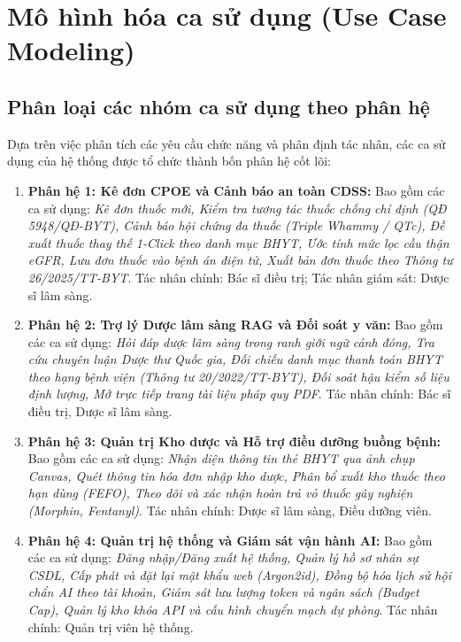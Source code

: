 \section{Mô hình hóa ca sử dụng (Use Case Modeling)}
\label{sec:use_case_modeling}

\subsection{Phân loại các nhóm ca sử dụng theo phân hệ}
\label{subsec:use_case_groups}

Dựa trên việc phân tích các yêu cầu chức năng và phân định tác nhân, các ca sử dụng của hệ thống được tổ chức thành bốn phân hệ cốt lõi:

\begin{enumerate}[leftmargin=1.8em]
    \item \textbf{Phân hệ 1: Kê đơn CPOE và Cảnh báo an toàn CDSS:}
    Bao gồm các ca sử dụng: \textit{Kê đơn thuốc mới, Kiểm tra tương tác thuốc chống chỉ định (QĐ 5948/QĐ-BYT), Cảnh báo hội chứng đa thuốc (Triple Whammy / QTc), Đề xuất thuốc thay thế 1-Click theo danh mục BHYT, Ước tính mức lọc cầu thận eGFR, Lưu đơn thuốc vào bệnh án điện tử, Xuất bản đơn thuốc theo Thông tư 26/2025/TT-BYT}. Tác nhân chính: Bác sĩ điều trị; Tác nhân giám sát: Dược sĩ lâm sàng.
    
    \item \textbf{Phân hệ 2: Trợ lý Dược lâm sàng RAG và Đối soát y văn:}
    Bao gồm các ca sử dụng: \textit{Hỏi đáp dược lâm sàng trong ranh giới ngữ cảnh đóng, Tra cứu chuyên luận Dược thư Quốc gia, Đối chiếu danh mục thanh toán BHYT theo hạng bệnh viện (Thông tư 20/2022/TT-BYT), Đối soát hậu kiểm số liệu định lượng, Mở trực tiếp trang tài liệu pháp quy PDF}. Tác nhân chính: Bác sĩ điều trị, Dược sĩ lâm sàng.
    
    \item \textbf{Phân hệ 3: Quản trị Kho dược và Hỗ trợ điều dưỡng buồng bệnh:}
    Bao gồm các ca sử dụng: \textit{Nhận diện thông tin thẻ BHYT qua ảnh chụp Canvas, Quét thông tin hóa đơn nhập kho dược, Phân bổ xuất kho thuốc theo hạn dùng (FEFO), Theo dõi và xác nhận hoàn trả vỏ thuốc gây nghiện (Morphin, Fentanyl)}. Tác nhân chính: Dược sĩ lâm sàng, Điều dưỡng viên.
    
    \item \textbf{Phân hệ 4: Quản trị hệ thống và Giám sát vận hành AI:}
    Bao gồm các ca sử dụng: \textit{Đăng nhập/Đăng xuất hệ thống, Quản lý hồ sơ nhân sự CSDL, Cấp phát và đặt lại mật khẩu web (Argon2id), Đồng bộ hóa lịch sử hội chẩn AI theo tài khoản, Giám sát lưu lượng token và ngân sách (Budget Cap), Quản lý kho khóa API và cấu hình chuyển mạch dự phòng}. Tác nhân chính: Quản trị viên hệ thống.
\end{enumerate}

